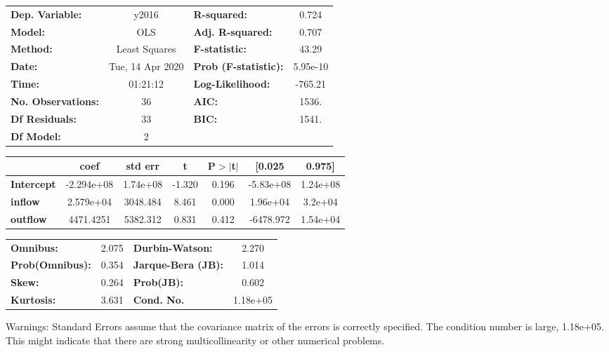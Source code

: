 \begin{center}
\begin{tabular}{lclc}
\toprule
\textbf{Dep. Variable:}    &      y2016       & \textbf{  R-squared:         } &     0.724   \\
\textbf{Model:}            &       OLS        & \textbf{  Adj. R-squared:    } &     0.707   \\
\textbf{Method:}           &  Least Squares   & \textbf{  F-statistic:       } &     43.29   \\
\textbf{Date:}             & Tue, 14 Apr 2020 & \textbf{  Prob (F-statistic):} &  5.95e-10   \\
\textbf{Time:}             &     01:21:12     & \textbf{  Log-Likelihood:    } &   -765.21   \\
\textbf{No. Observations:} &          36      & \textbf{  AIC:               } &     1536.   \\
\textbf{Df Residuals:}     &          33      & \textbf{  BIC:               } &     1541.   \\
\textbf{Df Model:}         &           2      & \textbf{                     } &             \\
\bottomrule
\end{tabular}
\begin{tabular}{lcccccc}
                   & \textbf{coef} & \textbf{std err} & \textbf{t} & \textbf{P$> |$t$|$} & \textbf{[0.025} & \textbf{0.975]}  \\
\midrule
\textbf{Intercept} &   -2.294e+08  &     1.74e+08     &    -1.320  &         0.196        &    -5.83e+08    &     1.24e+08     \\
\textbf{inflow}    &    2.579e+04  &     3048.484     &     8.461  &         0.000        &     1.96e+04    &      3.2e+04     \\
\textbf{outflow}   &    4471.4251  &     5382.312     &     0.831  &         0.412        &    -6478.972    &     1.54e+04     \\
\bottomrule
\end{tabular}
\begin{tabular}{lclc}
\textbf{Omnibus:}       &  2.075 & \textbf{  Durbin-Watson:     } &    2.270  \\
\textbf{Prob(Omnibus):} &  0.354 & \textbf{  Jarque-Bera (JB):  } &    1.014  \\
\textbf{Skew:}          &  0.264 & \textbf{  Prob(JB):          } &    0.602  \\
\textbf{Kurtosis:}      &  3.631 & \textbf{  Cond. No.          } & 1.18e+05  \\
\bottomrule
\end{tabular}
\end{center}

Warnings: \newline
 [1] Standard Errors assume that the covariance matrix of the errors is correctly specified. \newline
 [2] The condition number is large, 1.18e+05. This might indicate that there are \newline
 strong multicollinearity or other numerical problems.